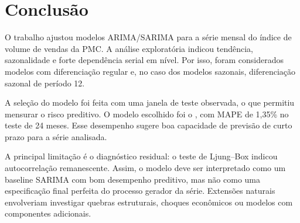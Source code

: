 ﻿\section{Conclusão}

O trabalho ajustou modelos ARIMA/SARIMA para a série mensal do índice de volume de vendas da PMC. A análise exploratória indicou tendência, sazonalidade e forte dependência serial em nível. Por isso, foram considerados modelos com diferenciação regular e, no caso dos modelos sazonais, diferenciação sazonal de período 12.

A seleção do modelo foi feita com uma janela de teste observada, o que permitiu mensurar o risco preditivo. O modelo escolhido foi o \sarimafinal, com MAPE de 1,35\% no teste de 24 meses. Esse desempenho sugere boa capacidade de previsão de curto prazo para a série analisada.

A principal limitação é o diagnóstico residual: o teste de Ljung--Box indicou autocorrelação remanescente. Assim, o modelo deve ser interpretado como um baseline SARIMA com bom desempenho preditivo, mas não como uma especificação final perfeita do processo gerador da série. Extensões naturais envolveriam investigar quebras estruturais, choques econômicos ou modelos com componentes adicionais.

